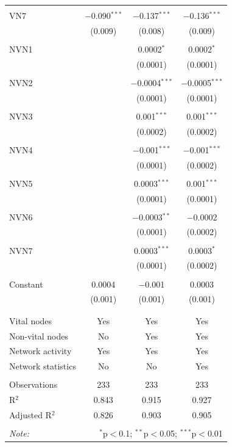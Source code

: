\begin{table}[!htbp]
\begin{tabular}{@{\extracolsep{5pt}}lccc}
  & & & \\ 
 VN7 & $-$0.090$^{***}$ & $-$0.137$^{***}$ & $-$0.136$^{***}$ \\ 
  & (0.009) & (0.008) & (0.009) \\ 
  & & & \\ 
 NVN1 &  & 0.0002$^{*}$ & 0.0002$^{*}$ \\ 
  &  & (0.0001) & (0.0001) \\ 
  & & & \\ 
 NVN2 &  & $-$0.0004$^{***}$ & $-$0.0005$^{***}$ \\ 
  &  & (0.0001) & (0.0001) \\ 
  & & & \\ 
 NVN3 &  & 0.001$^{***}$ & 0.001$^{***}$ \\ 
  &  & (0.0002) & (0.0002) \\ 
  & & & \\ 
 NVN4 &  & $-$0.001$^{***}$ & $-$0.001$^{***}$ \\ 
  &  & (0.0001) & (0.0002) \\ 
  & & & \\ 
 NVN5 &  & 0.0003$^{***}$ & 0.001$^{***}$ \\ 
  &  & (0.0001) & (0.0001) \\ 
  & & & \\ 
 NVN6 &  & $-$0.0003$^{**}$ & $-$0.0002 \\ 
  &  & (0.0001) & (0.0002) \\ 
  & & & \\ 
 NVN7 &  & 0.0003$^{***}$ & 0.0003$^{*}$ \\ 
  &  & (0.0001) & (0.0002) \\ 
  & & & \\ 
 Constant & 0.0004 & $-$0.001 & 0.0003 \\ 
  & (0.001) & (0.001) & (0.001) \\ 
  & & & \\ 
\hline \\[-1.8ex] 
Vital nodes & Yes & Yes & Yes \\ 
Non-vital nodes & No & Yes & Yes \\ 
Network activity & Yes & Yes & Yes \\ 
Network statistics & No & No & Yes \\ 
\hline &  &  &  \\ 
Observations & 233 & 233 & 233 \\ 
R$^{2}$ & 0.843 & 0.915 & 0.927 \\ 
Adjusted R$^{2}$ & 0.826 & 0.903 & 0.905 \\ 
\hline 
\hline \\[-1.8ex] 
\textit{Note:}  & \multicolumn{3}{r}{$^{*}$p$<$0.1; $^{**}$p$<$0.05; $^{***}$p$<$0.01} \\ 
\end{tabular} 
\end{table} 
